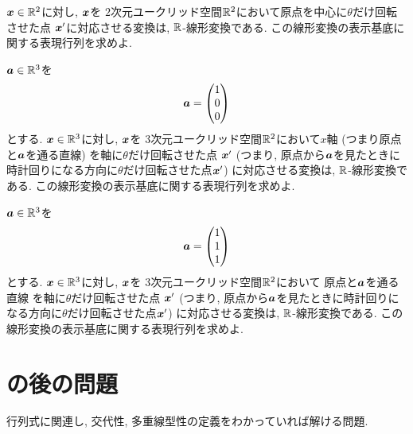 \begin{quiz}
  $\boldsymbol{x}\in \mathbb{R}^2$に対し,
  $\boldsymbol{x}$を
  $2$次元ユークリッド空間$\mathbb{R}^2$において原点を中心に$\theta$だけ回転させた点
  $\boldsymbol{x}'$に対応させる変換は,
  $\mathbb{R}$-線形変換である.
  この線形変換の表示基底に関する表現行列を求めよ.
\end{quiz}

\begin{quiz}
  $\boldsymbol{a}\in\mathbb{R}^3$を
  \begin{align*}
    \boldsymbol{a}=\begin{pmatrix}1\\0\\0\end{pmatrix}
  \end{align*}
  とする.
  $\boldsymbol{x}\in \mathbb{R}^3$に対し,
  $\boldsymbol{x}$を
  $3$次元ユークリッド空間$\mathbb{R}^2$において$x$軸
  (つまり原点と$\boldsymbol{a}$を通る直線)
  を軸に$\theta$だけ回転させた点
  $\boldsymbol{x}'$
  (つまり,
  原点から$\boldsymbol{a}$を見たときに時計回りになる方向に$\theta$だけ回転させた点$\boldsymbol{x}'$)
  に対応させる変換は,
  $\mathbb{R}$-線形変換である.
  この線形変換の表示基底に関する表現行列を求めよ.
\end{quiz}

\begin{quiz}
  $\boldsymbol{a}\in\mathbb{R}^3$を
  \begin{align*}
    \boldsymbol{a}=\begin{pmatrix}1\\1\\1\end{pmatrix}
  \end{align*}
  とする.
  $\boldsymbol{x}\in \mathbb{R}^3$に対し,
  $\boldsymbol{x}$を
  $3$次元ユークリッド空間$\mathbb{R}^2$において
  原点と$\boldsymbol{a}$を通る直線
  を軸に$\theta$だけ回転させた点
  $\boldsymbol{x}'$
  (つまり,
  原点から$\boldsymbol{a}$を見たときに時計回りになる方向に$\theta$だけ回転させた点$\boldsymbol{x}'$)
  に対応させる変換は,
  $\mathbb{R}$-線形変換である.
  この線形変換の表示基底に関する表現行列を求めよ.
\end{quiz}


\section{の後の問題}
行列式に関連し, 交代性, 多重線型性の定義をわかっていれば解ける問題.
